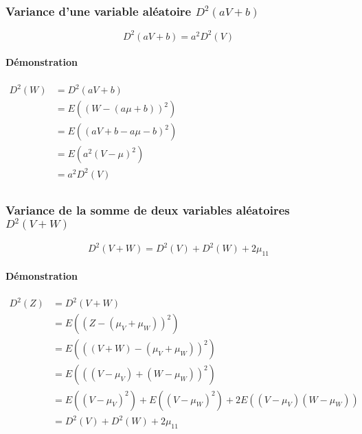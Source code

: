 \newpage
\subsubsection{Variance d'une variable aléatoire $D^2(aV+b)$}
\label{distribution-variance}
$$\boxed{D^2(aV+b) = a^2D^2(V)}$$
\paragraph{Démonstration}
\begin{center}
$\begin{array}{LL}
D^2(W) &= D^2(aV+b)\\
       &= E\left((W-(a\mu+b))^2\right)\\
       &= E\left((aV+b-a\mu-b)^2\right)\\
       &= E\left(a^2(V-\mu)^2\right)\\
       &= a^2D^2(V)\\
\end{array}$
\end{center}






\subsubsection{Variance de la somme de deux variables aléatoires $D^2(V+W)$}
\label{distribution-somme-variance}
$$\boxed{D^2(V+W) = D^2(V)+D^2(W)+2\mu_{11}}$$
\paragraph{Démonstration}
\begin{center}
$\begin{array}{LL}
D^2(Z) &= D^2(V+W)\\
       &= E\left((Z-(\mu_V+\mu_W))^2\right)\\
       &= E\left(((V+W)-(\mu_V+\mu_W))^2\right)\\
       &= E\left(((V-\mu_V)+(W-\mu_W))^2\right)\\
       &= E\left((V-\mu_V)^2\right) + E\left((V-\mu_W)^2\right) + 2E\left((V-\mu_V)(W-\mu_W)\right)\\
       &= D^2(V)+D^2(W)+2\mu_{11}\\
\end{array}$
\end{center}
